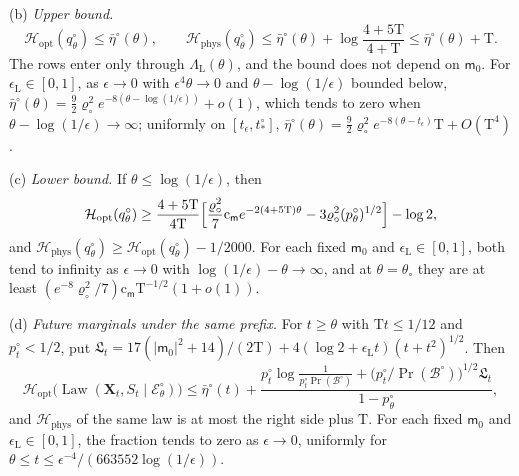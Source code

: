 (b) \emph{Upper bound.}
\[
 \mathcal H_{\mathrm{opt}}(q^\circ_\theta)\le\bar\eta^\circ(\theta),
 \qquad
 \mathcal H_{\mathrm{phys}}(q^\circ_\theta)
 \le\bar\eta^\circ(\theta)+\log\frac{4+5\mathrm T}{4+\mathrm T}
 \le\bar\eta^\circ(\theta)+\mathrm T .
\]
The rows enter only through \(\Lambda_{\mathrm L}(\theta)\), and the bound
does not depend on \(\mathsf m_0\). For \(\epsilon_{\mathrm L}\in[0,1]\), as
\(\epsilon\to0\) with \(\epsilon^4\theta\to0\) and
\(\theta-\log(1/\epsilon)\) bounded below,
\(\bar\eta^\circ(\theta)=\frac92\varrho_\circ^2e^{-8(\theta-\log(1/\epsilon))}+o(1)\),
which tends to zero when \(\theta-\log(1/\epsilon)\to\infty\); uniformly on
\([t_\epsilon,t^\circ_*]\),
\(\bar\eta^\circ(\theta)=\frac92\varrho_\circ^2e^{-8(\theta-t_\epsilon)}\mathrm T
+O(\mathrm T^4)\).

(c) \emph{Lower bound.} If \(\theta\le\log(1/\epsilon)\), then
\[
 \mathcal H_{\mathrm{opt}}(q^\circ_\theta)
 \ge\frac{4+5\mathrm T}{4\mathrm T}
 \Bigl[\frac{\varrho_\circ^2}7\mathrm c_{\mathsf m}e^{-2(4+5\mathrm T)\theta}
       -3\varrho_\circ^2(p^\circ_\theta)^{1/2}\Bigr]-\log2,
\]
and \(\mathcal H_{\mathrm{phys}}(q^\circ_\theta)\ge
\mathcal H_{\mathrm{opt}}(q^\circ_\theta)-1/2000\). For each fixed
\(\mathsf m_0\) and \(\epsilon_{\mathrm L}\in[0,1]\), both tend to infinity
as \(\epsilon\to0\) with \(\log(1/\epsilon)-\theta\to\infty\), and at
\(\theta=\theta_\circ\) they are at least
\((e^{-8}\varrho_\circ^2/7)\mathrm c_{\mathsf m}\mathrm T^{-1/2}(1+o(1))\).

(d) \emph{Future marginals under the same prefix.} For \(t\ge\theta\) with
\(\mathrm Tt\le1/12\) and \(p^\circ_t<1/2\), put
\(\mathfrak L_t=17(|\mathsf m_0|^2+14)/(2\mathrm T)
+4(\log2+\epsilon_{\mathrm L}t)(t+t^2)^{1/2}\). Then
\[
 \mathcal H_{\mathrm{opt}}\bigl(\operatorname{Law}(\mathbf X_t,S_t\mid
 \mathscr E^\circ_\theta)\bigr)
 \le\bar\eta^\circ(t)+\frac{p^\circ_t\log\frac1{p^\circ_t\Pr(\mathscr B^\circ)}
 +\bigl(p^\circ_t/\Pr(\mathscr B^\circ)\bigr)^{1/2}\mathfrak L_t}{1-p^\circ_\theta},
\]
and \(\mathcal H_{\mathrm{phys}}\) of the same law is at most the right side
plus \(\mathrm T\). For each fixed \(\mathsf m_0\) and
\(\epsilon_{\mathrm L}\in[0,1]\), the fraction tends to zero as
\(\epsilon\to0\), uniformly for
\(\theta\le t\le\epsilon^{-4}/(663552\log(1/\epsilon))\).

